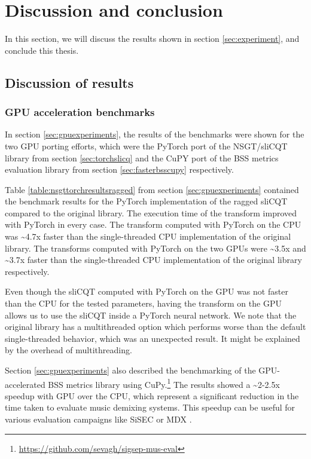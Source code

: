 \documentclass[report.tex]{subfiles}
\begin{document}
\section{Discussion and conclusion}

In this section, we will discuss the results shown in section \ref{sec:experiment}, and conclude this thesis.

\subsection{Discussion of results}
\label{sec:discussion}

\subsubsection{GPU acceleration benchmarks}

In section \ref{sec:gpuexperiments}, the results of the benchmarks were shown for the two GPU porting efforts, which were the PyTorch port of the NSGT/sliCQT library from section \ref{sec:torchslicq} and the CuPY port of the BSS metrics evaluation library from section \ref{sec:fasterbsscupy} respectively.

Table \ref{table:nsgttorchresultsragged} from section \ref{sec:gpuexperiments} contained the benchmark results for the PyTorch implementation of the ragged sliCQT compared to the original library. The execution time of the transform improved with PyTorch in every case. The transform computed with PyTorch on the CPU was \textasciitilde4.7x faster than the single-threaded CPU implementation of the original library. The transforms computed with PyTorch on the two GPUs were \textasciitilde3.5x and \textasciitilde3.7x faster than the single-threaded CPU implementation of the original library respectively.

Even though the sliCQT computed with PyTorch on the GPU was not faster than the CPU for the tested parameters, having the transform on the GPU allows us to use the sliCQT inside a PyTorch neural network. We note that the original library has a multithreaded option which performs worse than the default single-threaded behavior, which was an unexpected result. It might be explained by the overhead of multithreading.

Section \ref{sec:gpuexperiments} also described the benchmarking of the GPU-accelerated BSS metrics library using CuPy.\footnote{\url{https://github.com/sevagh/sigsep-mus-eval}} The results showed a \textasciitilde2-2.5x speedup with GPU over the CPU, which represent a significant reduction in the time taken to evaluate music demixing systems. This speedup can be useful for various evaluation campaigns like SiSEC \parencite{sisec2018} or MDX \parencite{mdx21}.
\end{document}
